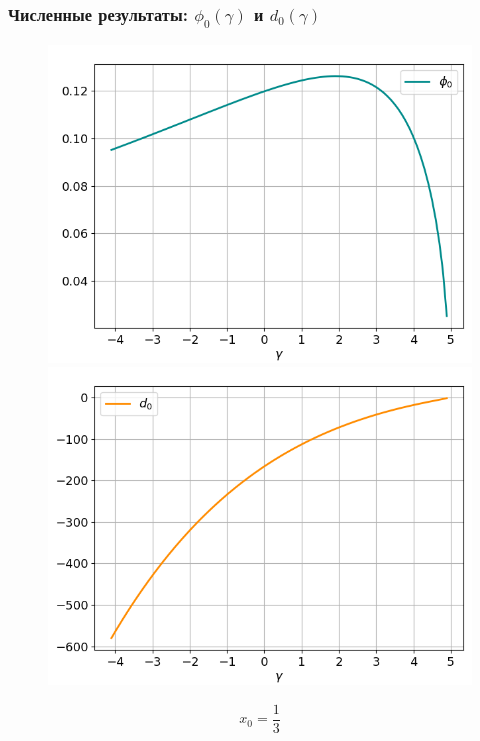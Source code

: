 \documentclass[fullscreen=true, unicode, bookmarks=false]{beamer}
\begin{document}
\begin{frame}
\frametitle{ Численные результаты: $ \phi_0(\gamma) $ и $ d_0(\gamma) $ }

\begin{figure} 
\includegraphics[scale=0.37]{oscillating_phi0_13.png}  
\hfill
\includegraphics[scale=0.37]{oscillating_d0_13.png}  
\end{figure}

$$ x_0 = \frac{1}{3} $$

\end{frame}
\end{document}
